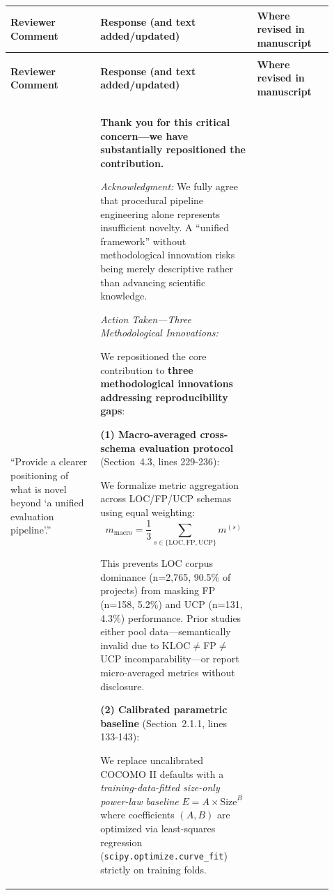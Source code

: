 \documentclass[11pt,a4paper]{article}
\begin{document}
\begin{longtable}{>{\raggedright\arraybackslash}p{0.26\linewidth}|>{\raggedright\arraybackslash}p{0.44\linewidth}|>{\raggedright\arraybackslash}p{0.22\linewidth}}
\toprule
\textbf{Reviewer Comment} & \textbf{Response (and text added/updated)} & \textbf{Where revised in manuscript} \\
\midrule
\endfirsthead

\multicolumn{3}{c}{\textit{(Continued from previous page)}} \\
\toprule
\textbf{Reviewer Comment} & \textbf{Response (and text added/updated)} & \textbf{Where revised in manuscript} \\
\midrule
\endhead

\midrule
\multicolumn{3}{r}{\textit{(Continued on next page)}} \\
\endfoot

\bottomrule
\endlastfoot

``Provide a clearer positioning of what is novel beyond `a unified evaluation pipeline'.'' &

\textbf{Thank you for this critical concern---we have substantially repositioned the contribution.}

\textit{Acknowledgment:} We fully agree that procedural pipeline engineering alone represents insufficient novelty. A ``unified framework'' without methodological innovation risks being merely descriptive rather than advancing scientific knowledge.

\textit{Action Taken---Three Methodological Innovations:}

We repositioned the core contribution to \textbf{three methodological innovations addressing reproducibility gaps}:

\textbf{(1) Macro-averaged cross-schema evaluation protocol} (Section~4.3, lines 229-236):

We formalize metric aggregation across LOC/FP/UCP schemas using equal weighting:
$$m_{\text{macro}} = \frac{1}{3}\sum_{s \in \{\text{LOC}, \text{FP}, \text{UCP}\}} m^{(s)}$$

This prevents LOC corpus dominance (n=2,765, 90.5\% of projects) from masking FP (n=158, 5.2\%) and UCP (n=131, 4.3\%) performance. Prior studies either pool data---semantically invalid due to KLOC$\neq$FP$\neq$UCP incomparability---or report micro-averaged metrics without disclosure.

\textbf{(2) Calibrated parametric baseline} (Section~2.1.1, lines 133-143):

We replace uncalibrated COCOMO II defaults with a \textit{training-data-fitted size-only power-law baseline} $E = A \times \text{Size}^B$ where coefficients $(A, B)$ are optimized via least-squares regression (\texttt{scipy.optimize.curve\_fit}) strictly on training folds.


\end{longtable}
\end{document}
